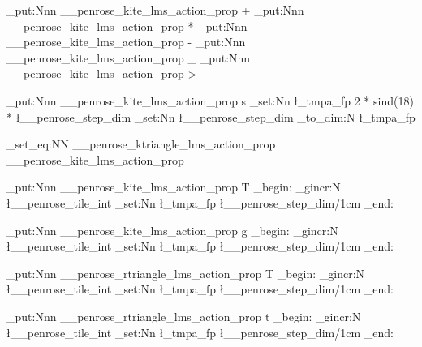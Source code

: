 \prop_put:Nnn \g__penrose_kite_lms_action_prop {+} {}
\prop_put:Nnn \g__penrose_kite_lms_action_prop {*} {}
\prop_put:Nnn \g__penrose_kite_lms_action_prop {-} {}
\prop_put:Nnn \g__penrose_kite_lms_action_prop {_} {}
\prop_put:Nnn \g__penrose_kite_lms_action_prop {>} {}

\prop_put:Nnn \g__penrose_kite_lms_action_prop {s} {
  \fp_set:Nn \l_tmpa_fp { 2 * sind(18) * \l__penrose_step_dim }
  \dim_set:Nn \l__penrose_step_dim {\fp_to_dim:N \l_tmpa_fp}
}

\prop_set_eq:NN \g__penrose_ktriangle_lms_action_prop  \g__penrose_kite_lms_action_prop


\prop_put:Nnn \g__penrose_kite_lms_action_prop {T} {
  \group_begin:
  \int_gincr:N \l__penrose_tile_int
  \fp_set:Nn \l_tmpa_fp {\l__penrose_step_dim/1cm}
  \group_end:
}

\prop_put:Nnn \g__penrose_kite_lms_action_prop {g} {
  \group_begin:
  \int_gincr:N \l__penrose_tile_int
  \fp_set:Nn \l_tmpa_fp {\l__penrose_step_dim/1cm}
  \group_end:
}

\prop_put:Nnn \g__penrose_rtriangle_lms_action_prop {T} {
  \group_begin:
  \int_gincr:N \l__penrose_tile_int
  \fp_set:Nn \l_tmpa_fp {\l__penrose_step_dim/1cm}
  \group_end:
}

\prop_put:Nnn \g__penrose_rtriangle_lms_action_prop {t} {
  \group_begin:
  \int_gincr:N \l__penrose_tile_int
  \fp_set:Nn \l_tmpa_fp {\l__penrose_step_dim/1cm}
  \group_end:
}

